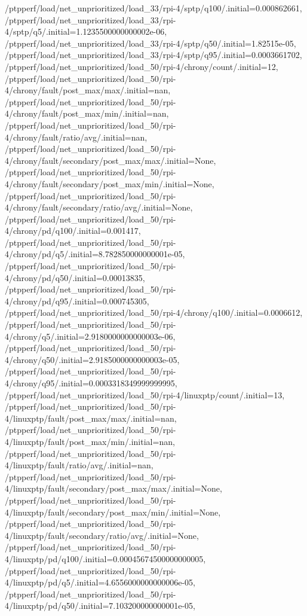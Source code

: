{    /ptpperf/load/net_unprioritized/load_33/rpi-4/sptp/q100/.initial=0.000862661,
    /ptpperf/load/net_unprioritized/load_33/rpi-4/sptp/q5/.initial=1.1235500000000002e-06,
    /ptpperf/load/net_unprioritized/load_33/rpi-4/sptp/q50/.initial=1.82515e-05,
    /ptpperf/load/net_unprioritized/load_33/rpi-4/sptp/q95/.initial=0.0003661702,
    /ptpperf/load/net_unprioritized/load_50/rpi-4/chrony/count/.initial=12,
    /ptpperf/load/net_unprioritized/load_50/rpi-4/chrony/fault/post_max/max/.initial=nan,
    /ptpperf/load/net_unprioritized/load_50/rpi-4/chrony/fault/post_max/min/.initial=nan,
    /ptpperf/load/net_unprioritized/load_50/rpi-4/chrony/fault/ratio/avg/.initial=nan,
    /ptpperf/load/net_unprioritized/load_50/rpi-4/chrony/fault/secondary/post_max/max/.initial=None,
    /ptpperf/load/net_unprioritized/load_50/rpi-4/chrony/fault/secondary/post_max/min/.initial=None,
    /ptpperf/load/net_unprioritized/load_50/rpi-4/chrony/fault/secondary/ratio/avg/.initial=None,
    /ptpperf/load/net_unprioritized/load_50/rpi-4/chrony/pd/q100/.initial=0.001417,
    /ptpperf/load/net_unprioritized/load_50/rpi-4/chrony/pd/q5/.initial=8.782850000000001e-05,
    /ptpperf/load/net_unprioritized/load_50/rpi-4/chrony/pd/q50/.initial=0.00013835,
    /ptpperf/load/net_unprioritized/load_50/rpi-4/chrony/pd/q95/.initial=0.000745305,
    /ptpperf/load/net_unprioritized/load_50/rpi-4/chrony/q100/.initial=0.0006612,
    /ptpperf/load/net_unprioritized/load_50/rpi-4/chrony/q5/.initial=2.9180000000000003e-06,
    /ptpperf/load/net_unprioritized/load_50/rpi-4/chrony/q50/.initial=2.9185000000000003e-05,
    /ptpperf/load/net_unprioritized/load_50/rpi-4/chrony/q95/.initial=0.0003318349999999995,
    /ptpperf/load/net_unprioritized/load_50/rpi-4/linuxptp/count/.initial=13,
    /ptpperf/load/net_unprioritized/load_50/rpi-4/linuxptp/fault/post_max/max/.initial=nan,
    /ptpperf/load/net_unprioritized/load_50/rpi-4/linuxptp/fault/post_max/min/.initial=nan,
    /ptpperf/load/net_unprioritized/load_50/rpi-4/linuxptp/fault/ratio/avg/.initial=nan,
    /ptpperf/load/net_unprioritized/load_50/rpi-4/linuxptp/fault/secondary/post_max/max/.initial=None,
    /ptpperf/load/net_unprioritized/load_50/rpi-4/linuxptp/fault/secondary/post_max/min/.initial=None,
    /ptpperf/load/net_unprioritized/load_50/rpi-4/linuxptp/fault/secondary/ratio/avg/.initial=None,
    /ptpperf/load/net_unprioritized/load_50/rpi-4/linuxptp/pd/q100/.initial=0.00045674500000000005,
    /ptpperf/load/net_unprioritized/load_50/rpi-4/linuxptp/pd/q5/.initial=4.6556000000000006e-05,
    /ptpperf/load/net_unprioritized/load_50/rpi-4/linuxptp/pd/q50/.initial=7.103200000000001e-05,
}
